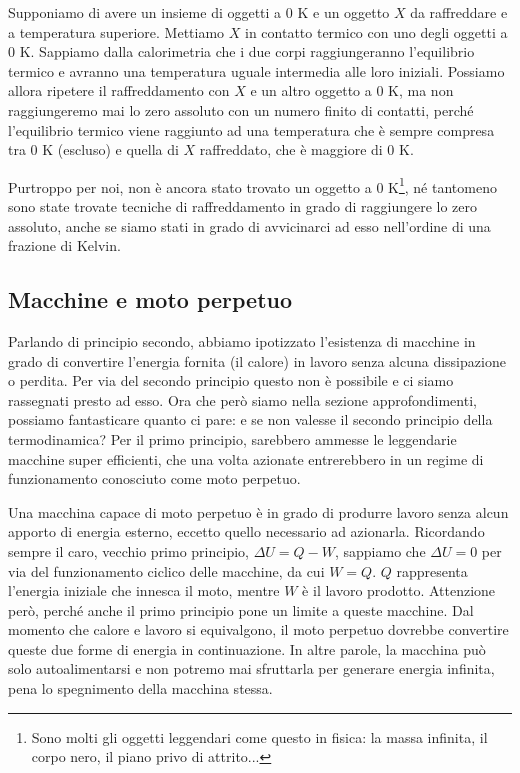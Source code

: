Supponiamo di avere un insieme di oggetti a 0 K e un oggetto $X$ da
raffreddare e a temperatura superiore. Mettiamo $X$ in
contatto termico con uno degli oggetti a 0 K. Sappiamo dalla calorimetria
che i due corpi raggiungeranno l'equilibrio termico e avranno una
temperatura uguale intermedia alle loro iniziali. Possiamo allora
ripetere il raffreddamento con $X$ e un altro oggetto a 0 K, ma
non raggiungeremo mai lo zero assoluto con un numero finito di
contatti, perché l'equilibrio termico viene raggiunto ad una temperatura
che è sempre compresa tra 0 K (escluso) e quella di $X$ raffreddato, che
è maggiore di 0 K.

Purtroppo per noi, non è ancora stato trovato un oggetto a 0 K\footnote{Sono
molti gli oggetti leggendari come questo in fisica: la massa infinita, il
corpo nero, il piano privo di attrito...}, né tantomeno sono state
trovate tecniche di raffreddamento in grado di raggiungere lo zero
assoluto, anche se siamo stati in grado di avvicinarci ad esso
nell'ordine di una frazione di Kelvin.


\subsection{Macchine e moto perpetuo}
Parlando di principio secondo, abbiamo ipotizzato l'esistenza di macchine
in grado di convertire l'energia fornita (il calore) in lavoro senza alcuna
dissipazione o perdita. Per via del secondo principio questo non è possibile
e ci siamo rassegnati presto ad esso. Ora che però siamo nella sezione approfondimenti,
possiamo fantasticare quanto ci pare: e se non valesse il secondo principio
della termodinamica? Per il primo principio, sarebbero ammesse le leggendarie
macchine super efficienti, che una volta azionate entrerebbero in un regime
di funzionamento conosciuto come moto perpetuo.

Una macchina capace di moto
perpetuo è in grado di produrre lavoro senza alcun apporto di energia esterno,
eccetto quello necessario ad azionarla. Ricordando sempre il caro, vecchio primo
principio, $\Delta U = Q - W$, sappiamo che $\Delta U = 0$ per via del
funzionamento ciclico delle macchine, da cui $W = Q$. $Q$ rappresenta l'energia
iniziale che innesca il moto, mentre $W$ è il lavoro prodotto. Attenzione però,
perché anche il primo principio pone un limite a queste macchine.
Dal momento che calore e lavoro si equivalgono, il moto perpetuo dovrebbe
convertire queste due forme di energia in continuazione. In altre parole,
la macchina può solo autoalimentarsi e non potremo mai sfruttarla per generare
energia infinita, pena lo spegnimento della macchina stessa.

